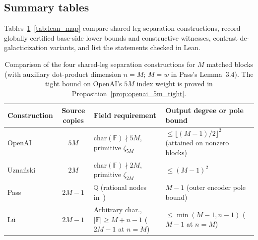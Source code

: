 \documentclass[11pt,a4paper]{article}
\theoremstyle{plain}
\theoremstyle{definition}
\theoremstyle{remark}
\newcommand{\Q}{\mathbb{Q}}
\newcommand{\F}{\mathbb{F}}
\begin{document}
\appendix

\begin{landscape}
\section{Summary tables}
\label{app:tables}

Tables~\ref{tab:separations}--\ref{tab:lean_map} compare shared-leg separation constructions, record globally certified base-side lower bounds and constructive witnesses, contrast de-galacticization variants, and list the statements checked in Lean.

\begin{table}[!htbp]
\centering
\small
\caption{Comparison of the four shared-leg separation constructions for $M$ matched blocks (with auxiliary dot-product dimension $n = M$; $M = w$ in Pass's Lemma~3.4). The tight bound on OpenAI's $5M$ index weight is proved in Proposition~\ref{prop:openai_5m_tight}.}
\label{tab:separations}
\begin{tabular}{@{} l c l l @{}}
\toprule
\textbf{Construction} & \textbf{Source copies} & \textbf{Field requirement} & \textbf{Output degree or pole bound} \\
\midrule
OpenAI~\cite[Prop.~3.1]{OpenAI2026Upper} & $5M$ & $\mathrm{char}(\F) \nmid 5M$, primitive $\zeta_{5M}$ & $\le \lfloor (M - 1)/2 \rfloor^2$ (attained on nonzero blocks) \\
Uzna\'nski~\cite[App.~C]{Uznanski2026} & $2M$ & $\mathrm{char}(\F) \nmid 2M$, primitive $\zeta_{2M}$ & $\le (M - 1)^2$ \\
Pass~\cite[Lemma~3.4]{Pass2026} & $2M - 1$ & $\Q$ (rational nodes in~\cite[Lemma~3.4]{Pass2026}) & $M - 1$ (outer encoder pole bound) \\
L\"u~\cite[Prop.~2.1]{Lu2026} & $2M - 1$ & Arbitrary char., $|\F| \ge M + n - 1$ ($2M - 1$ at $n = M$) & $\le \min(M - 1, n - 1)$ ($M - 1$ at $n = M$) \\
\bottomrule
\end{tabular}
\end{table}


\end{landscape}
\end{document}
